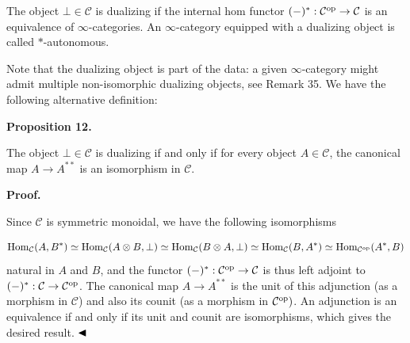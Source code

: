 \documentclass[10pt,a4paper]{article}
\begin{document}
 
The object $\bot\in{\mathcal{C}}$ is dualizing if the internal hom functor $(-)^{*}:{\mathcal{C}}^{\textnormal{op}}\to{\mathcal{C}}$ is an equivalence of $\infty$-categories. An $\infty$-category equipped with a dualizing object is called $\ast$-autonomous.\par
 
 
 
 
Note that the dualizing object is part of the data: a given $\infty$-category might admit multiple non-isomorphic dualizing objects, see Remark 35. We have the following alternative definition:\par
 
 
 
\par\medskip\noindent\textbf{Proposition 12.}\par
 
 
The object $\bot\in{\mathcal{C}}$ is dualizing if and only if for every object $A\in{\mathcal{C}}$, the canonical map $A\to A^{**}$ is an isomorphism in ${\mathcal{C}}$.\par
 
 
 
 
\par\medskip\noindent\textbf{Proof.}\par
 
 
Since ${\mathcal{C}}$ is symmetric monoidal, we have the following isomorphisms\par
    \[\operatorname{Hom}_{\mathcal{C}}(A,B^{*})\simeq\operatorname{Hom}_{\mathcal{C}}(A\otimes B,\bot)\simeq\operatorname{Hom}_{\mathcal{C}}(B\otimes A,\bot)\simeq\operatorname{Hom}_{\mathcal{C}}(B,A^{*})\simeq\operatorname{Hom}_{{\mathcal{C}}^{\textnormal{op}}}(A^{*},B)\]    
natural in $A$ and $B$, and the functor $(-)^{*}:{\mathcal{C}}^{\textnormal{op}}\to{\mathcal{C}}$ is thus left adjoint to $(-)^{*}:{\mathcal{C}}\to{\mathcal{C}}^{\textnormal{op}}$. The canonical map $A\to A^{**}$ is the unit of this adjunction (as a morphism in ${\mathcal{C}}$) and also its counit (as a morphism in ${\mathcal{C}}^{\textnormal{op}})$. An adjunction is an equivalence if and only if its unit and counit are isomorphisms, which gives the desired result. $\hfill\blacktriangleleft$\par
 
\end{document}

